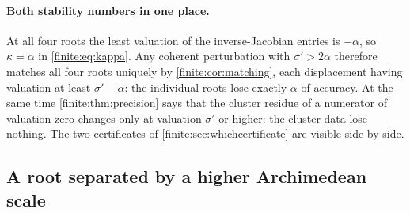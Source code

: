 \documentclass[11pt,letterpaper]{article}
\theoremstyle{definition}
\theoremstyle{remark}
\numberwithin{equation}{section}
\begin{document}
\paragraph{Both stability numbers in one place.}
At all four roots the least valuation of the inverse-Jacobian entries is $-\alpha$, so $\kappa=\alpha$ in \eqref{finite:eq:kappa}. Any coherent perturbation with $\sigma'>2\alpha$ therefore matches all four roots uniquely by \cref{finite:cor:matching}, each displacement having valuation at least $\sigma'-\alpha$: the individual roots lose exactly $\alpha$ of accuracy. At the same time \cref{finite:thm:precision} says that the cluster residue of a numerator of valuation zero changes only at valuation $\sigma'$ or higher: the cluster data lose nothing. The two certificates of \cref{finite:sec:whichcertificate} are visible side by side.

\subsection{A root separated by a higher Archimedean scale}
\label{finite:sec:higherrank}
\end{document}
